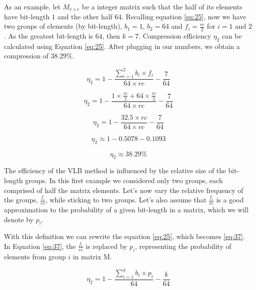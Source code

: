 \documentclass[10pt]{article}
\begin{document}
As an example, let $M_{r\times c}$ be a integer matrix such that the half of its elements have bit-length $1$ and the other half $64$. Recalling equation \ref{eq:25}, now we have two groups of elements (by bit-length), $b_1=1 $, $b_2=64$ and $f_i = \frac{rc}{2}$ for $i = 1 \text{ and } 2$. As the greatest bit-length is $64$, then $k=7$. Compression efficiency $\eta_2$ can be calculated using Equation \ref{eq:25}. After plugging in our numbers, we obtain a compression of $38.29\%$.

\begin{equation*} %
 \eta_2 = 1 - \frac{\sum_{i=1}^{2}  b_i \times f_i }{64 \times rc} - \frac{7}{64} 
\end{equation*}

\begin{equation*} %
 \eta_2 = 1 - \frac{  1 \times \frac{rc}{2} + 64 \times \frac{rc}{2} }{64 \times rc} - \frac{7}{64} 
\end{equation*}

\begin{equation*} %
 \eta_2 = 1 - \frac{  32.5  \times rc }{64 \times rc} - \frac{7}{64} 
\end{equation*}

\begin{equation*} %
 \eta_2 \approx 1 - 0.5078 - 0.1093
\end{equation*}

\begin{equation*} %
 \eta_2 \approx 38.29\%
\end{equation*}

The efficiency of the VLB method is influenced by the relative size of the bit-length groups. In this first example we considered only two groups, each comprised of half the matrix elements. Let's now vary the relative frequency of the groups, $\frac{f_i}{rc}$, while sticking to two groups. Let's also assume that $\frac{f_i}{rc}$ is a good approximation to the probability of a given bit-length in a matrix, which we will denote by $p_i$.

With this definition we can rewrite the equation \ref{eq:25}, which becomes \ref{eq:37}. In Equation \ref{eq:37}, the $\frac{f_i}{rc}$ is replaced by $p_i$, representing the probability of elements from group $i$ in matrix M.

\begin{equation}\label{eq:37}
 \eta_2 = 1 - \frac{\sum_{i=1}^{g}  b_i \times p_i }{64} - \frac{k}{64} 
\end{equation}
\end{document}
